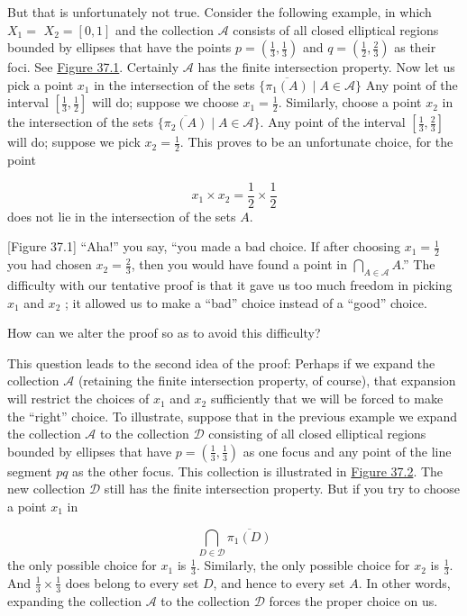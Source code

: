 But that is unfortunately not true. Consider the following example, in which \(X_{1} =\) \(X_{2} = [ {0,1}]\) and the collection \(\mathcal{A}\) consists of all closed elliptical regions bounded by ellipses that have the points \(p = ( {\frac{1}{3},\frac{1}{3}})\) and \(q = ( {\frac{1}{2},\frac{2}{3}})\) as their foci. See \hyperref[fig:37.1]{Figure 37.1}. Certainly \(\mathcal{A}\) has the finite intersection property. Now let us pick a point \(x_{1}\) in the intersection of the sets \(\{ {\overline{{\pi }_{1}(A) } \mid A \in \mathcal{A}}\}\) Any point of the interval \([ {\frac{1}{3},\frac{1}{2}}]\) will do; suppose we choose \(x_{1} = \frac{1}{2}\). Similarly, choose a point \(x_{2}\) in the intersection of the sets \(\{ {\overline{{\pi }_{2}(A) } \mid A \in \mathcal{A}}\}\). Any point of the interval \([ {\frac{1}{3},\frac{2}{3}}]\) will do; suppose we pick \(x_{2} = \frac{1}{2}\). This proves to be an unfortunate choice, for the point

\[
x_{1} \times {x}_{2} = \frac{1}{2} \times \frac{1}{2}
\]
does not lie in the intersection of the sets \(A\).

[Figure 37.1]
``Aha!'' you say, ``you made a bad choice. If after choosing \(x_{1} = \frac{1}{2}\) you had chosen \(x_{2} = \frac{2}{3}\), then you would have found a point in \(\mathop{\bigcap }\limits_{{A \in \mathcal{A}}}A\).'' The difficulty with our tentative proof is that it gave us too much freedom in picking \(x_{1}\) and \(x_{2}\) ; it allowed us to make a ``bad'' choice instead of a ``good'' choice.

How can we alter the proof so as to avoid this difficulty?

This question leads to the second idea of the proof: Perhaps if we expand the collection \(\mathcal{A}\) (retaining the finite intersection property, of course), that expansion will restrict the choices of \(x_{1}\) and \(x_{2}\) sufficiently that we will be forced to make the ``right'' choice. To illustrate, suppose that in the previous example we expand the collection \(\mathcal{A}\) to the collection \(\mathcal{D}\) consisting of all closed elliptical regions bounded by ellipses that have \(p = ( {\frac{1}{3},\frac{1}{3}})\) as one focus and any point of the line segment \({pq}\) as the other focus. This collection is illustrated in \hyperref[fig:37.2]{Figure 37.2}. The new collection \(\mathcal{D}\) still has the finite intersection property. But if you try to choose a point \(x_{1}\) in

\[
\mathop{\bigcap }\limits_{{D \in \mathcal{D}}}\overline{{\pi }_{1}(D) }
\]
the only possible choice for \(x_{1}\) is \(\frac{1}{3}\). Similarly, the only possible choice for \(x_{2}\) is \(\frac{1}{3}\). And \(\frac{1}{3} \times \frac{1}{3}\) does belong to every set \(D\), and hence to every set \(A\). In other words, expanding the collection \(\mathcal{A}\) to the collection \(\mathcal{D}\) forces the proper choice on us.

